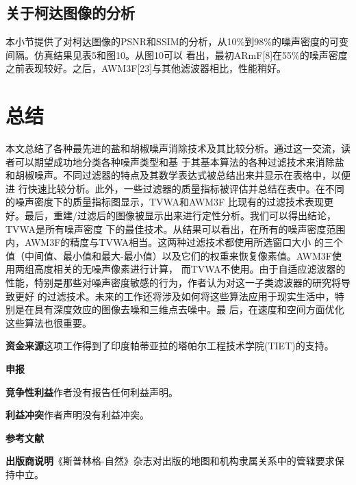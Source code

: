 \documentclass[12pt]{article} %
\begin{document}
\subsection{关于柯达图像的分析}
本小节提供了对柯达图像的PSNR和SSIM的分析，从10\%到98\%的噪声密度的可变间隔。仿真结果见表5和图10。从图10可以
看出，最初ARmF[8]在55\%的噪声密度之前表现较好。之后，AWM3F[23]与其他滤波器相比，性能稍好。

\section{总结\label{sec:5}}
本文总结了各种最先进的盐和胡椒噪声消除技术及其比较分析。通过这一交流，读者可以期望成功地分类各种噪声类型和基
于其基本算法的各种过滤技术来消除盐和胡椒噪声。不同过滤器的特点及其数学表达式被总结出来并显示在表格中，以便进
行快速比较分析。此外，一些过滤器的质量指标被评估并总结在表中。在不同的噪声密度下的质量指标图显示，TVWA和AWM3F
比现有的过滤技术表现更好。最后，重建/过滤后的图像被显示出来进行定性分析。我们可以得出结论，TVWA是所有噪声密度
下的最佳技术。从结果可以看出，在所有的噪声密度范围内，AWM3F的精度与TVWA相当。这两种过滤技术都使用所选窗口大小
的三个值（中间值、最小值和最大-最小值）以及它们的权重来恢复像素值。AWM3F使用两组高度相关的无噪声像素进行计算，
而TVWA不使用。由于自适应滤波器的性能，特别是那些对噪声密度敏感的行为，作者认为对这一子类滤波器的研究将导致更好
的过滤技术。未来的工作还将涉及如何将这些算法应用于现实生活中，特别是在具有深度效应的图像去噪和三维点去噪中。最
后，在速度和空间方面优化这些算法也很重要。

\vspace{1em}

\textbf{资金来源}\hspace{2em}这项工作得到了印度帕蒂亚拉的塔帕尔工程技术学院(TIET)的支持。

\vspace{1em}

\textbf{申报}

\vspace{1em}

\textbf{竞争性利益}\hspace{2em}作者没有报告任何利益声明。

\vspace{1em}

\textbf{利益冲突}\hspace{2em}作者声明没有利益冲突。

\vspace{1em}

\textbf{参考文献}


\vspace{1em}
\textbf{出版商说明}\hspace{2em}《斯普林格-自然》杂志对出版的地图和机构隶属关系中的管辖要求保持中立。
\end{document}
